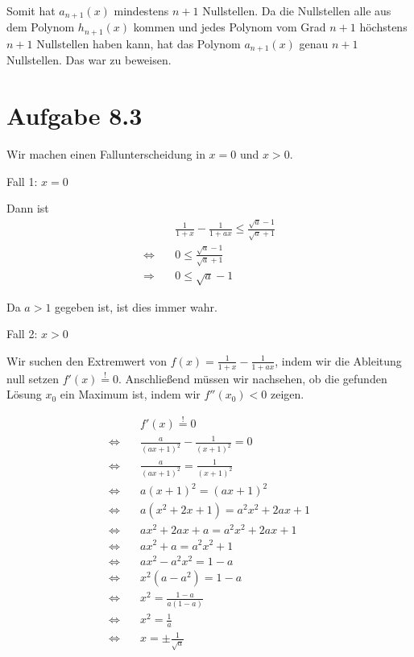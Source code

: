 \documentclass[a4paper,german,12pt,smallheadings]{scrartcl}
\begin{document}
Somit hat $a_{n+1}(x)$ mindestens $n+1$ Nullstellen. Da die Nullstellen alle
aus dem Polynom $h_{n+1}(x)$ kommen und jedes Polynom vom Grad $n+1$ höchstens
$n+1$ Nullstellen haben kann, hat das Polynom $a_{n+1}(x)$ genau $n+1$
Nullstellen. Das war zu beweisen.

\section*{Aufgabe 8.3}

Wir machen einen Fallunterscheidung in $x = 0$ und $x > 0$.

Fall 1: $x=0$

Dann ist
\begin{align*}
  &\frac{1}{1+x} - \frac{1}{1+ax} \leq \frac{\sqrt{a} - 1}{\sqrt{a} + 1} \\
  \Leftrightarrow\quad& 0 \leq \frac{\sqrt{a} - 1}{\sqrt{a} + 1} \\
  \Rightarrow\quad&     0 \leq \sqrt{a} - 1
\end{align*}

Da $a > 1$ gegeben ist, ist dies immer wahr.

Fall 2: $x > 0$

Wir suchen den Extremwert von $f(x) = \frac{1}{1+x} - \frac{1}{1+ax}$, indem
wir die Ableitung null setzen $f'(x) \overset{!}{=} 0$. Anschließend müssen wir
nachsehen, ob die gefunden Lösung $x_0$ ein Maximum ist, indem wir $f''(x_0) <
0$ zeigen.

\begin{align*}
  &f'(x) \overset{!}{=} 0 \\
  \Leftrightarrow\quad& \frac{a}{(ax+1)^2} - \frac{1}{(x+1)^2} = 0 \\
  \Leftrightarrow\quad& \frac{a}{(ax+1)^2} = \frac{1}{(x+1)^2} \\
  \Leftrightarrow\quad& a(x+1)^2 = (ax+1)^2 \\
  \Leftrightarrow\quad& a(x^2+2x+1) = a^2x^2+2ax+1 \\
  \Leftrightarrow\quad& ax^2+2ax+a = a^2x^2+2ax+1 \\
  \Leftrightarrow\quad& ax^2+a = a^2x^2+1 \\
  \Leftrightarrow\quad& ax^2-a^2x^2 = 1-a \\
  \Leftrightarrow\quad& x^2(a-a^2) = 1-a \\
  \Leftrightarrow\quad& x^2 = \frac{1-a}{a(1-a)} \\
  \Leftrightarrow\quad& x^2 = \frac{1}{a} \\
  \Leftrightarrow\quad& x = \pm \frac{1}{\sqrt{a}} \\
\end{align*}
\end{document}
